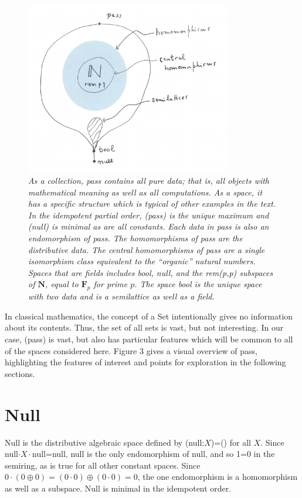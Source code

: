 \documentclass[11pt]{article}
\begin{document}
\begin{figure}[h]
\centering
\includegraphics[width=0.8\textwidth]{pass.png}
\caption{{\it As a collection, pass contains all pure data; that is, all objects with mathematical 
meaning as well as all computations.  As a space, it has a specific structure which is typical of other examples in the text.  
In the idempotent partial order, (pass) is the unique maximum and (null) is minimal as are all constants.  
Each data in pass is also an endomorphism of pass.  The homomorphisms of pass are the distributive data.  
The central homomorphisms of pass are a single isomorphism class equivalent to the ``organic'' natural 
numbers.  Spaces that are fields includes bool, null, and the rem(p,p) subspaces of ${\mathbf N}$, equal to ${\mathbf F}_p$ for prime $p$. 
The space bool is the unique space with two data and is a semilattice as well as a field.}}
\end{figure}

In classical mathematics, the concept of a Set intentionally gives no information about its contents.  Thus, the set of all sets is vast, but 
not interesting.  In our case, (pass) is vast, but also has particular features which will be common to all of the spaces considered here. 
Figure 3 gives a visual overview of pass, highlighting the features of interest and points for exploration in the following sections. 

\section{Null}

    Null is the distributive algebraic space defined by (null:$X$)=() for all $X$.  Since null$\cdot X\cdot$null=null, null is the only endomorphism 
of null, and so 1=0 in the semiring, as is true for all other constant spaces.  Since $0\cdot(0\oplus 0)=(0\cdot 0) \oplus (0\cdot 0)=0$, the one 
endomorphism is a homomorphism as well as a subspace.   Null is minimal in the idempotent order. 
\end{document}
